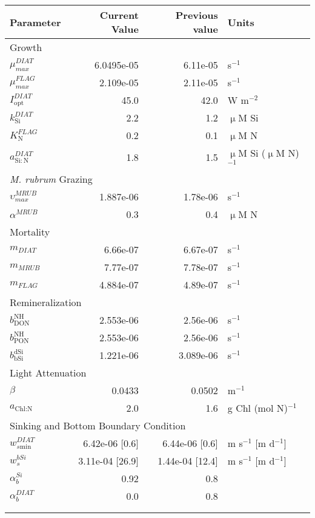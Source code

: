    \small
   \centering
   \begin{tabular}{lrrl}\toprule
    Parameter & Current Value & Previous value & Units \\ \midrule
     \multicolumn{4}{l}{Growth}  \\
     $\mu^{DIAT}_{max}$ & 6.0495e-05 & 6.11e-05 & s$^{-1}$ \\
     $\mu^{FLAG}_{max}$ & 2.109e-05 & 2.11e-05 & s$^{-1}$ \\
     $I_{\text{opt}}^{DIAT}$ & 45.0 & 42.0 & W m$^{-2}$ \\
     $k_\mathrm{Si}^{DIAT}$ & 2.2 & 1.2 & $\upmu$M Si \\
     $K_\mathrm{N}^{FLAG}$ & 0.2 & 0.1 & $\upmu$M N \\
     $a_{\mathrm{Si:N}}^{DIAT}$ & 1.8 & 1.5 & $\upmu$M Si ($\upmu$M N)$^{-1}$ \\
   \midrule
     \multicolumn{4}{l}{\textit{M. rubrum} Grazing}  \\
     $\upsilon_{max}^{MRUB}$ & 1.887e-06 & 1.78e-06 & s$^{-1}$ \\
     $\alpha^{MRUB}$ & 0.3 & 0.4 & $\upmu$M N \\
   \midrule
     \multicolumn{4}{l}{Mortality}  \\
     $m_{DIAT}$ & 6.66e-07 & 6.67e-07 & s$^{-1}$ \\
     $m_{MRUB}$ & 7.77e-07 & 7.78e-07 & s$^{-1}$ \\
     $m_{FLAG}$ & 4.884e-07 & 4.89e-07 & s$^{-1}$ \\
   \midrule
     \multicolumn{4}{l}{Remineralization}  \\
     $b_{\textrm{DON}}^{\textrm{NH}}$ & 2.553e-06 & 2.56e-06 & s$^{-1}$ \\
     $b_{\textrm{PON}}^{\textrm{NH}}$ & 2.553e-06 & 2.56e-06 & s$^{-1}$ \\
     $b_{\textrm{bSi}}^{\textrm{dSi}}$ & 1.221e-06 & 3.089e-06 & s$^{-1}$ \\
   \midrule
     \multicolumn{4}{l}{Light Attenuation}  \\
     $\beta$ & 0.0433 & 0.0502 & m$^{-1}$ \\
     $a_{\textrm{Chl:N}}$ & 2.0 & 1.6 & g Chl (mol N)$^{-1}$ \\
   \midrule
     \multicolumn{4}{l}{Sinking and Bottom Boundary Condition}  \\
     $w_{s\mathrm{min}}^{DIAT}$ & 6.42e-06 [0.6] & 6.44e-06 [0.6] & m s$^{-1}$ [m d$^{-1}$] \\
     $w_{s}^{bSi}$ & 3.11e-04 [26.9] & 1.44e-04 [12.4] & m s$^{-1}$ [m d$^{-1}$] \\
     $\alpha_b^{Si}$ & 0.92 & 0.8 &  \\
     $\alpha_b^{DIAT}$ & 0.0 & 0.8 &  \\
   \midrule
 \\ \\   \end{tabular}
